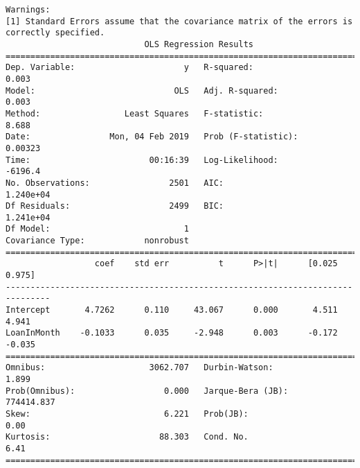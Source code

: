 \documentclass[11pt]{article}
\begin{document}
\begin{Verbatim}[commandchars=\\\{\}]
Warnings:
[1] Standard Errors assume that the covariance matrix of the errors is correctly specified.
                            OLS Regression Results                            
==============================================================================
Dep. Variable:                      y   R-squared:                       0.003
Model:                            OLS   Adj. R-squared:                  0.003
Method:                 Least Squares   F-statistic:                     8.688
Date:                Mon, 04 Feb 2019   Prob (F-statistic):            0.00323
Time:                        00:16:39   Log-Likelihood:                -6196.4
No. Observations:                2501   AIC:                         1.240e+04
Df Residuals:                    2499   BIC:                         1.241e+04
Df Model:                           1                                         
Covariance Type:            nonrobust                                         
===============================================================================
                  coef    std err          t      P>|t|      [0.025      0.975]
-------------------------------------------------------------------------------
Intercept       4.7262      0.110     43.067      0.000       4.511       4.941
LoanInMonth    -0.1033      0.035     -2.948      0.003      -0.172      -0.035
==============================================================================
Omnibus:                     3062.707   Durbin-Watson:                   1.899
Prob(Omnibus):                  0.000   Jarque-Bera (JB):           774414.837
Skew:                           6.221   Prob(JB):                         0.00
Kurtosis:                      88.303   Cond. No.                         6.41
==============================================================================


\end{Verbatim}
\end{document}
